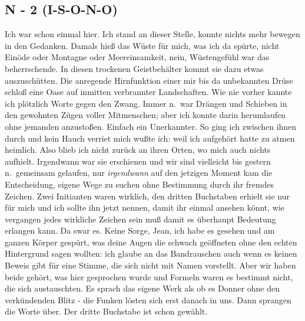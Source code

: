 \documentclass[
]{article}
\author{}
\date{\vspace{-2.5em}}
\begin{document}
\subsection{N - 2 (I-S-O-N-O)}\label{n---2-i-s-o-n-o}

Ich war schon einmal hier. Ich stand an dieser Stelle, konnte nichts
mehr bewegen in den Gedanken. Damals hieß das Wüste für mich, was ich da
spürte, nicht Einöde oder Montagne oder Meereinsamkeit, nein,
Wüstengefühl war das beherrschende. In diesen trockenen Geistbehälter
kommt sie dazu etwas auszuschütten. Die anregende Hirnfunktion einer mir
bis da unbekannten Drüse schloß eine Oase auf inmitten verbrannter
Landschaften. Wie nie vorher kannte ich plötzlich Worte gegen den Zwang.
Immer n.~war Drängen und Schieben in den gewohnten Zügen voller
Mitmenschen; aber ich konnte darin herumlaufen ohne jemanden anzustoßen.
Einfach ein Unerkannter. So ging ich zwischen ihnen durch und kein Hauch
verriet mich wußte ich: weil ich aufgehört hatte zu atmen heimlich. Also
blieb ich nicht zurück an ihren Orten, wo mich auch nichts aufhielt.
Irgendwann war sie erschienen und wir sind vielleicht bis gestern
n.~gemeinsam gelaufen, nur \emph{irgendwann }auf den jetzigen Moment kam
die Entscheidung, eigene Wege zu suchen ohne Bestimmung durch ihr
fremdes Zeichen. Zwei Initianten waren wirklich, den dritten Buchstaben
erhielt sie nur für mich und ich sollte ihn jetzt nennen, damit ihr
einmal ansehen könnt, wie vergangen jedes wirkliche Zeichen sein muß
damit es überhaupt Bedeutung erlangen kann. Da swar es. Keine Sorge,
Jean, ich habe es gesehen und am ganzen Körper gespürt, was deine Augen
die schwach geöffneten ohne den echten Hintergrund sagen wollten: ich
glaube an das Bandrauschen auch wenn es keinen Beweis gibt für eine
Stimme, die sich nicht mit Namen vorstellt. Aber wir haben beide gehört,
was hier gesprochen wurde und Formeln waren es bestimmt nicht, die sich
austauschten. Es sprach das eigene Werk als ob es Donner ohne den
verkündenden Blitz - die Funken lösten sich erst danach in uns. Dann
sprangen die Worte über. Der dritte Buchstabe ist schon gewählt.
\end{document}
